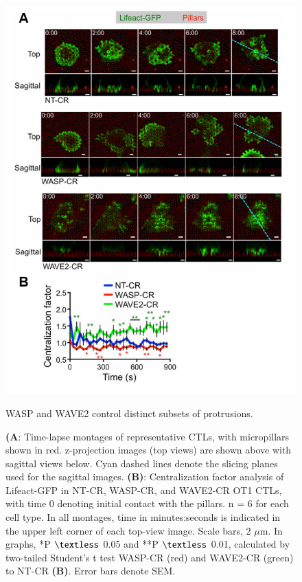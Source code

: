 \begin{figure}[htbp]
	\centering
	\includegraphics[width=\textwidth]{../figures/chapter2/fig5flcrisprs.png}
	\caption{WASP and WAVE2 control distinct subsets of protrusions.}
	\caption*{\textbf{(A}: Time-lapse montages of representative CTLs, with micropillars shown in red. z-projection images (top views) are shown above with sagittal views below. Cyan dashed lines denote the slicing planes used for the sagittal images. \textbf{(B)}: Centralization factor analysis of Lifeact-GFP in NT-CR, WASP-CR, and WAVE2-CR OT1 CTLs, with time 0 denoting initial contact with the pillars. n = 6 for each cell type. In all montages, time in minutes:seconds is indicated in the upper left corner of each top-view image. Scale bars, 2 $\mu$m. In graphs, *P $\textless$ 0.05 and **P $\textless$ 0.01, calculated by two-tailed Student’s t test  WASP-CR (red) and WAVE2-CR (green) to NT-CR \textbf{(B)}. Error bars denote SEM.}
	\label{fig:fig5flcrisprs}
\end{figure}

